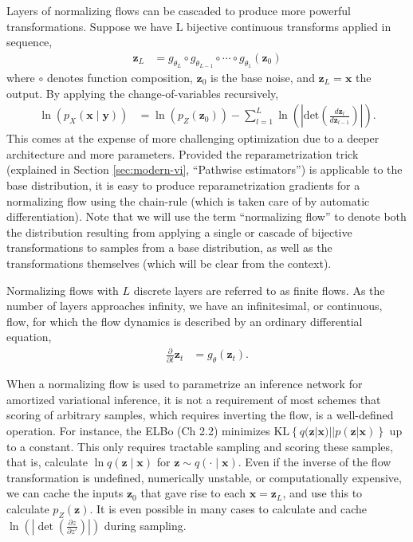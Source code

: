 Layers of normalizing flows can be cascaded to produce more powerful transformations. Suppose we have L bijective continuous transforms applied in sequence,
\begin{align*}
	\mathbf{z}_L &= g_{\theta_L}\circ g_{\theta_{L-1}}\circ\cdots\circ g_{\theta_1}(\mathbf{z}_0)
\end{align*}
where $\circ$ denotes function composition, $\mathbf{z}_0$ is the base noise, and $\mathbf{z}_L=\mathbf{x}$ the output. By applying the change-of-variables recursively,
\begin{align*}
	\ln(p_X(\mathbf{x}\mid\mathbf{y})) &= \ln(p_Z(\mathbf{z}_0)) - \sum^L_{l=1}\ln\left(\left|\text{det}\left(\frac{d\mathbf{z}_l}{d\mathbf{z}_{l-1}}\right)\right|\right).
\end{align*}
This comes at the expense of more challenging optimization due to a deeper architecture and more parameters. Provided the reparametrization trick (explained in Section \ref{sec:modern-vi}, ``Pathwise estimators'') is applicable to the base distribution, it is easy to produce reparametrization gradients for a normalizing flow using the chain-rule (which is taken care of by automatic differentiation). Note that we will use the term ``normalizing flow'' to denote both the distribution resulting from applying a single or cascade of bijective transformations to samples from a base distribution, as well as the transformations themselves (which will be clear from the context).

Normalizing flows with $L$ discrete layers are referred to as finite flows. As the number of layers approaches infinity, we have an infinitesimal, or continuous, flow, for which the flow dynamics is described by an ordinary differential equation,
\begin{align*}
	\frac{\partial}{\partial t}\mathbf{z}_t &= g_\theta(\mathbf{z}_t).
\end{align*}

When a normalizing flow is used to parametrize an inference network for amortized variational inference, it is not a requirement of most schemes that scoring of arbitrary samples, which requires inverting the flow, is a well-defined operation. For instance, the ELBo (Ch 2.2) minimizes $\text{KL}\left\{q(\mathbf{z}|\mathbf{x})||p(\mathbf{z}|\mathbf{x})\right\}$ up to a constant. This only requires tractable sampling and scoring these samples, that is, calculate $\ln q(\mathbf{z}\mid\mathbf{x})$ for $\mathbf{z}\sim q(\cdot\mid\mathbf{x})$. Even if the inverse of the flow transformation is undefined, numerically unstable, or computationally expensive, we can cache the inputs $\mathbf{z}_0$ that gave rise to each $\mathbf{x}=\mathbf{z}_L$, and use this to calculate $p_Z(\mathbf{z})$. It is even possible in many cases to calculate and cache $\ln(|\det(\frac{\partial z}{\partial z'})|)$ during sampling.

